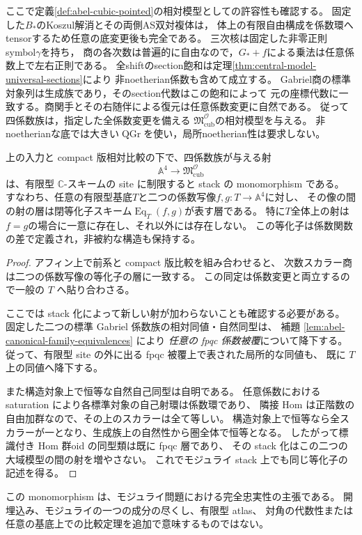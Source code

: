 ここで定義\ref{def:abel-cubic-pointed}の相対模型としての許容性も確認する。
固定した$B_*$のKoszul解消とその両側AS双対複体は，
体上の有限自由構成を係数環へtensorするため任意の底変更後も完全である。
三次核は固定した非零正則symbol$\gamma$を持ち，
商の各次数は普遍的に自由なので，$G_*+f$による乗法は任意係数上で左右正則である。
全shiftのsection飽和は定理\ref{thm:central-model-universal-sections}により
非noetherian係数も含めて成立する。
Gabriel商の標準対象列は生成族であり，そのsection代数はこの飽和によって
元の座標代数に一致する。商関手とその右随伴による復元は任意係数変更に自然である。
従って四係数族は，指定した全係数変更を備える
$\mathfrak M^{\mathcal O}_{\mathrm{cub}}$の相対模型を与える。
非noetherianな底では大きい$\operatorname{QGr}$を使い，局所noetherian性は要求しない。

\begin{proposition}
\label{prop:rigid-four-family-monomorphism}
上の入力と compact 版相対比較の下で、四係数族が与える射
\[
 \mathbb A^4\longrightarrow\mathfrak M^{\mathcal O}_{\mathrm{cub}}
\]
は、有限型 $\mathbb C$-スキームの site に制限すると stack の monomorphism である。
すなわち、任意の有限型基底$T$と二つの係数写像$f,g:T\to\mathbb A^4$に対し、
その像の間の射の層は閉等化子スキーム$\operatorname{Eq}_T(f,g)$が表す層である。
特に$T$全体上の射は$f=g$の場合に一意に存在し、それ以外には存在しない。
この等化子は係数関数の差で定義され，非被約な構造も保持する。
\end{proposition}

\begin{proof}
アフィン上で前系と compact 版比較を組み合わせると、
次数スカラー商は二つの係数写像の等化子の層に一致する。
この同定は係数変更と両立するので一般の $T$ へ貼り合わさる。

ここでは stack 化によって新しい射が加わらないことも確認する必要がある。
固定した二つの標準 Gabriel 係数族の相対同値・自然同型は、
補題 \ref{lem:abel-canonical-family-equivalences} により
\emph{任意の fpqc 係数被覆}について降下する。
従って、有限型 site の外に出る fpqc 被覆上で表された局所的な同値も、
既に $T$ 上の同値へ降下する。

また構造対象上で恒等な自然自己同型は自明である。
任意係数における saturation により各標準対象の自己射環は係数環であり、
隣接 Hom は正階数の自由加群なので、その上のスカラーは全て等しい。
構造対象上で恒等なら全スカラーが一となり、生成族上の自然性から圏全体で恒等となる。
したがって標識付き Hom 群oid の同型類は既に fpqc 層であり、
その stack 化はこの二つの大域模型の間の射を増やさない。
これでモジュライ stack 上でも同じ等化子の記述を得る。
\end{proof}

この monomorphism は、モジュライ問題における完全忠実性の主張である。
開埋込み、モジュライの一つの成分の尽くし、有限型 atlas、
対角の代数性または任意の基底上での比較定理を追加で意味するものではない。
